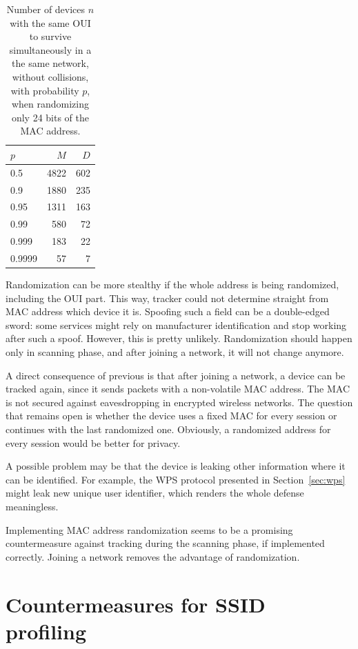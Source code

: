 \documentclass[12pt,a4paper,oneside,pdftex]{report}
\begin{document}
\begin{table}[ht]
\center
\begin{tabular}{|l|r|r|}
    \hline
    $p$ & $M$ & $D$   \\ \hline
    0.5 & 4822 & 602 \\ \hline
    0.9 & 1880 & 235 \\ \hline
    0.95 & 1311 & 163 \\ \hline
    0.99 & 580 & 72 \\ \hline
    0.999 & 183 & 22 \\ \hline
    0.9999 & 57 & 7 \\ \hline
\end{tabular}
\caption{Number of devices $n$ with the same OUI to survive simultaneously in a the same network, without collisions, with probability $p$, when randomizing only 24 bits of the MAC address.}
\label{tab:prob_random}
\end{table}

Randomization can be more stealthy if the whole address is being randomized, including the OUI part. This way, tracker could not determine straight from MAC address which device it is. Spoofing such a field can be a double-edged sword: some services might rely on manufacturer identification and stop working after such a spoof. However, this is pretty unlikely. Randomization should happen only in scanning phase, and after joining a network, it will not change anymore.

A direct consequence of previous is that after joining a network, a device can be tracked again, since it sends packets with a non-volatile MAC address. The MAC is not secured against eavesdropping in encrypted wireless networks. The question that remains open is whether the device uses a fixed MAC for every session or continues with the last randomized one. Obviously, a randomized address for every session would be better for privacy.

A possible problem may be that the device is leaking other information where it can be identified. For example, the WPS protocol presented in Section~\ref{sec:wps} might leak new unique user identifier, which renders the whole defense meaningless.

Implementing MAC address randomization seems to be a promising countermeasure against tracking during the scanning phase, if implemented correctly. Joining a network removes the advantage of randomization.

\section{Countermeasures for SSID profiling}
\label{sec:countermeasures_ssid}
\end{document}
